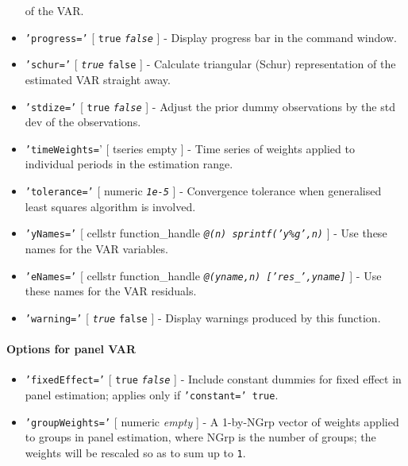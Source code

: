 \begin{itemize}
   of the VAR.
 \item
   \texttt{'progress='} {[} \texttt{true} \textbar{}
   \emph{\texttt{false}} {]} - Display progress bar in the command
   window.
 \item
   \texttt{'schur='} {[} \emph{\texttt{true}} \textbar{} \texttt{false}
   {]} - Calculate triangular (Schur) representation of the estimated VAR
   straight away.
 \item
   \texttt{'stdize='} {[} \texttt{true} \textbar{} \emph{\texttt{false}}
   {]} - Adjust the prior dummy observations by the std dev of the
   observations.
 \item
   \texttt{'timeWeights=}' {[} tseries \textbar{} empty {]} - Time series
   of weights applied to individual periods in the estimation range.
 \item
   \texttt{'tolerance='} {[} numeric \textbar{} \emph{\texttt{1e-5}} {]}
   - Convergence tolerance when generalised least squares algorithm is
   involved.
 \item
   \texttt{'yNames='} {[} cellstr \textbar{} function\_handle \textbar{}
   \emph{\texttt{@(n) sprintf('y\%g',n)}} {]} - Use these names for the
   VAR variables.
 \item
   \texttt{'eNames='} {[} cellstr \textbar{} function\_handle \textbar{}
   \emph{\texttt{@(yname,n) {[}'res\_',yname{]}}} {]} - Use these names
   for the VAR residuals.
 \item
   \texttt{'warning='} {[} \emph{\texttt{true}} \textbar{} \texttt{false}
   {]} - Display warnings produced by this function.
 \end{itemize}
 
 \paragraph{Options for panel VAR}
 
 \begin{itemize}
 \item
   \texttt{'fixedEffect='} {[} \texttt{true} \textbar{}
   \emph{\texttt{false}} {]} - Include constant dummies for fixed effect
   in panel estimation; applies only if \texttt{'constant=' true}.
 \item
   \texttt{'groupWeights='} {[} numeric \textbar{} \emph{empty} {]} - A
   1-by-NGrp vector of weights applied to groups in panel estimation,
   where NGrp is the number of groups; the weights will be rescaled so as
   to sum up to \texttt{1}.
 \end{itemize}
 
